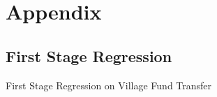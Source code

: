 \documentclass[
11pt,notheorems,compress,hyperref={pdfauthor=Maghfira Ramadhani}
]{beamer}
\begin{document}
\appendix
\section{Appendix}
\subsection{First Stage Regression}
\begin{frame}
    \begin{table}[h]
    \caption{First Stage Regression on Village Fund Transfer}
    \scalebox{0.5}{}    
    \end{table}
\end{frame}
\end{document}
